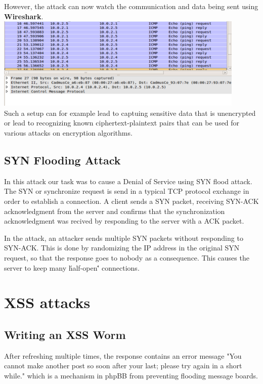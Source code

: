 \documentclass[12pt, a4paper, pdflatex]{article}
\begin{document}
However, the attack can now watch the communication and data being sent using \textbf{Wireshark}.\\

\includegraphics[width=450px]{gfx/imcp-shark}\\

Such a setup can for example lead to captuing sensitive data that is unencrypted or lead to recognizing known ciphertext-plaintext pairs that can be used for various attacks on encryption algorithms.




\subsection{SYN Flooding Attack}

In this attack our task was to cause a Denial of Service using SYN flood attack. The SYN or synchronize request is send in a typical TCP protocol exchange in order to establish a connection. A client sends a SYN packet, receiving SYN-ACK acknowledgment from the server and confirms that the synchronization acknowledgment was recived by responding to the server with a ACK packet.

In the attack, an attacker sends multiple SYN packets without responding to SYN-ACK. This is done by randomizing the IP address in the original SYN request, so that the response goes to nobody as a consequence. This causes the server to keep many \'half-open\'' connections.


\section{XSS attacks}

\subsection{Writing an XSS Worm}

After refreshing multiple times, the response contains an error message "You cannot make another post so soon after your last; please try again in a short while." which is a mechanism in phpBB from preventing flooding message boards.
\end{document}
